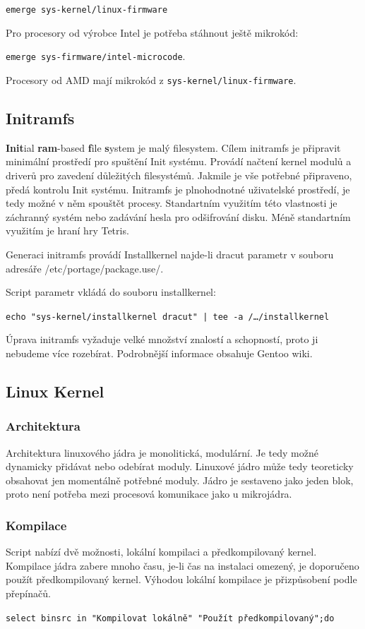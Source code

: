 \documentclass[12pt,a4paper,twoside,]{article}
\begin{document}
{\texttt{emerge sys-kernel/linux-firmware}

Pro procesory od výrobce Intel je potřeba stáhnout ještě mikrokód:

\texttt{emerge sys-firmware/intel-microcode}. 

Procesory od AMD mají mikrokód z \texttt{sys-kernel/linux-firmware}.
\subsection{\textsf{Initramfs}} \hypertarget{Initramfs}{}
{\bf Init}ial {\bf ram}-based {\bf f}ile {\bf s}ystem je malý filesystem. Cílem initramfs je připravit minimální prostředí pro spuštění Init systému. Provádí načtení kernel modulů a driverů pro zavedení důležitých filesystémů. Jakmile je vše potřebné připraveno, předá kontrolu Init systému.
Initramfs je plnohodnotné uživatelské prostředí, je tedy možné v něm spouštět procesy. Standartním využitím této vlastnosti je záchranný systém nebo zadávání hesla pro odšifrování disku. Méně standartním využitím je hraní hry Tetris. 

Generaci initramfs provádí Installkernel najde-li dracut parametr v souboru adresáře /etc/portage/package.use/.

Script parametr vkládá do souboru installkernel:

\texttt{echo "sys-kernel/installkernel dracut" | tee -a /\dots/installkernel}

Úprava initramfs vyžaduje velké množství znalostí a schopností, proto ji nebudeme více rozebírat. Podrobnější informace obsahuje Gentoo wiki. %


\subsection{\textsf{Linux Kernel}}

\subsubsection{\textsf{Architektura}}
Architektura linuxového jádra je monolitická, modulární. Je tedy možné dynamicky přidávat nebo odebírat moduly. Linuxové jádro může tedy teoreticky obsahovat jen momentálně potřebné moduly. Jádro je sestaveno jako jeden blok, proto není potřeba mezi procesová komunikace jako u mikrojádra. 
\subsubsection{\textsf{Kompilace}}
Script nabízí dvě možnosti, lokální kompilaci a předkompilovaný kernel. Kompilace jádra zabere mnoho času, je-li čas na instalaci omezený, je doporučeno použít předkompilovaný kernel. Výhodou lokální kompilace je přizpůsobení podle přepínačů. 

\hspace{-1.5em}\texttt{select binsrc in "Kompilovat lokálně" "Použít předkompilovaný";do}}\\
\end{document}
